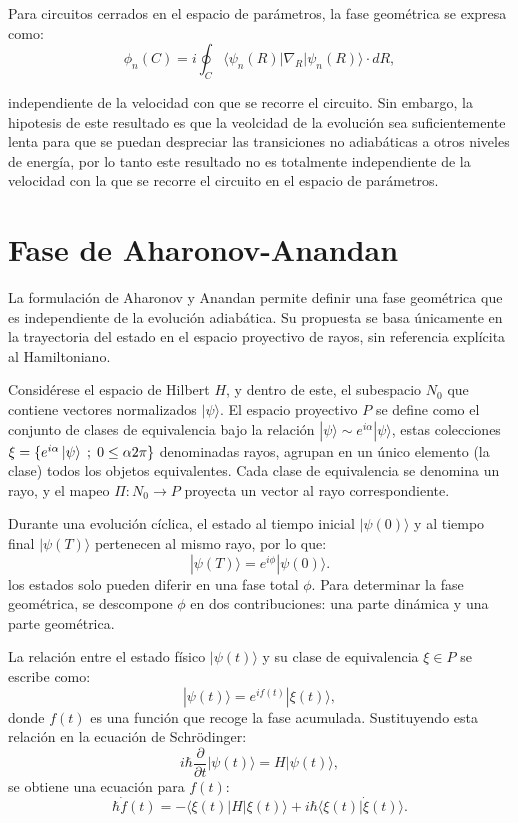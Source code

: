 Para circuitos cerrados en el espacio de parámetros, la fase geométrica se expresa como:
\begin{equation}\label{eq2:fg berry}
    \phi_n(C) = i \oint_C \langle \psi_n(R) | \nabla_R | \psi_n(R) \rangle \cdot dR,    
\end{equation}

independiente de la velocidad con que se recorre el circuito. Sin embargo, la hipotesis de este resultado es que la veolcidad de la evoluci\'on sea suficientemente lenta para que se puedan despreciar las transiciones no adiab\'aticas a otros niveles de energ\'ia, por lo tanto este resultado no es totalmente independiente de la velocidad con la que se recorre el circuito en el espacio de parámetros.

\section{Fase de Aharonov-Anandan}\label{sec2:fase AA}

La formulación de Aharonov y Anandan permite definir una fase geométrica que es independiente de la evolución adiabática. Su propuesta se basa únicamente en la trayectoria del estado en el espacio proyectivo de rayos, sin referencia explícita al Hamiltoniano.

Considérese el espacio de Hilbert \( H \), y dentro de este, el subespacio \( N_0 \) que contiene vectores normalizados \( | \psi \rangle \). El espacio proyectivo \( P \) se define como el conjunto de clases de equivalencia bajo la relación \( | \psi \rangle \sim e^{i\alpha} | \psi \rangle \), estas colecciones $\xi = \{e^{i\alpha}\ket{\psi} \; ; \; 0 \leq \alpha 2\pi\}$ denominadas rayos, agrupan en un \'unico elemento (la clase) todos los objetos equivalentes. Cada clase de equivalencia se denomina un rayo, y el mapeo \( \Pi : N_0 \to P \) proyecta un vector al rayo correspondiente.

Durante una evolución cíclica, el estado al tiempo inicial \( | \psi(0) \rangle \) y al tiempo final \( | \psi(T) \rangle \) pertenecen al mismo rayo, por lo que:
\[
| \psi(T) \rangle = e^{i\phi} | \psi(0) \rangle.
\]
los estados solo pueden diferir en una fase total $\phi$. Para determinar la fase geométrica, se descompone \( \phi \) en dos contribuciones: una parte dinámica y una parte geométrica.

La relación entre el estado físico \( | \psi(t) \rangle \) y su clase de equivalencia \( \xi \in P \) se escribe como:
\[
| \psi(t) \rangle = e^{i f(t)} | \xi(t) \rangle,
\]
donde \( f(t) \) es una función que recoge la fase acumulada. Sustituyendo esta relación en la ecuación de Schrödinger:
\[
i \hbar \frac{\partial}{\partial t} | \psi(t) \rangle = H | \psi(t) \rangle,
\]
se obtiene una ecuación para \( f(t) \):
\[
\hbar \dot{f}(t) = -\langle \xi(t) | H | \xi(t) \rangle + i \hbar \langle \xi(t) | \dot{\xi}(t) \rangle.
\]

